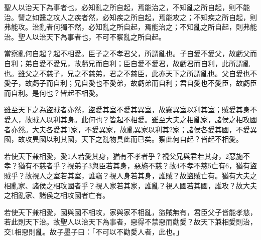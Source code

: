 
\begin{pinyinscope}
聖人以治天下為事者也，必知亂之所自起，焉能治之，不知亂之所自起，則不能治。譬之如醫之攻人之疾者然，必知疾之所自起，焉能攻之；不知疾之所自起，則弗能攻。治亂者何獨不然，必知亂之所自起，焉能治之；不知亂之所自起，則弗能治。聖人以治天下為事者也，不可不察亂之所自起。

當察亂何自起？起不相愛。臣子之不孝君父，所謂亂也。子自愛不愛父，故虧父而自利；弟自愛不愛兄，故虧兄而自利；臣自愛不愛君，故虧君而自利，此所謂亂也。雖父之不慈子，兄之不慈弟，君之不慈臣，此亦天下之所謂亂也。父自愛也不愛子，故虧子而自利；兄自愛也不愛弟，故虧弟而自利；君自愛也不愛臣，故虧臣而自利。是何也？皆起不相愛。

雖至天下之為盜賊者亦然，盜愛其室不愛其異室，故竊異室以利其室；賊愛其身不愛人，故賊人以利其身。此何也？皆起不相愛。雖至大夫之相亂家，諸侯之相攻國者亦然。大夫各愛其1家，不愛異家，故亂異家以利其2家；諸侯各愛其國，不愛異國，故攻異國以利其國，天下之亂物具此而已矣。察此何自起？皆起不相愛。

若使天下兼相愛，愛1人若愛其身，猶有不孝者乎？視父兄與君若其身，2惡施不孝？猶有不慈者乎？視弟子3與臣若其身，惡施不慈？故4不孝不慈5亡有6，猶有盜賊乎？故視人之室若其室，誰竊？視人身若其身，誰賊？故盜賊亡有。猶有大夫之相亂家、諸侯之相攻國者乎？視人家若其家，誰亂？視人國若其國，誰攻？故大夫之相亂家、諸侯之相攻國者亡有。

若使天下兼相愛，國與國不相攻，家與家不相亂，盜賊無有，君臣父子皆能孝慈，若此則天下治。故聖人以治天下為事者，惡得不禁惡而勸愛？故天下兼相愛則治，交1相惡則亂。故子墨子曰：「不可以不勸愛人者，此也。」


\end{pinyinscope}
